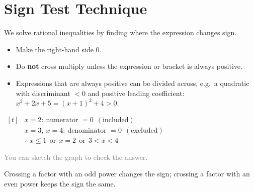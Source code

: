 \documentclass[a4paper,11pt,oneside]{book}
\providecommand{\sidenote}[1]{{\small\textcolor{gray}{#1}}}
\providecommand{\cdisp}[1]{\par\noindent$\displaystyle\begin{aligned}[t]#1\end{aligned}$\par\smallskip}
\renewcommand{\cdisp}[1]{\par\noindent\hfill$\displaystyle\begin{aligned}[t]#1\end{aligned}$\hfill\null\par\smallskip}
\begin{document}
\section{Sign Test Technique}
We solve rational inequalities by finding where the expression changes sign.\par
\begin{itemize}\setlength\itemsep{0pt}\setlength\parskip{0pt}
\item Make the right-hand side $0$.
\item Do \textbf{not} cross multiply unless the expression or bracket is always positive.
\item Expressions that are always positive can be divided across, e.g.\ a quadratic with discriminant $<0$ and positive leading coefficient: $x^{2}+2x+5=(x+1)^{2}+4>0$.
\end{itemize}
\exlab
{}
\begin{center}\end{center}
\cdisp{&x=2:\ \text{numerator }=0\ \ (\text{included})\\
&x=3,\ x=4:\ \text{denominator }=0\ \ (\text{excluded})\\
&\therefore\ x\leqslant1\ \ \text{or}\ \ x=2\ \ \text{or}\ \ 3<x<4}
\sidenote{You can sketch the graph to check the answer.}\par
\begin{info}[title=Note]
Crossing a factor with an odd power changes the sign; crossing a factor with an even power keeps the sign the same.
\end{info}
\clearpage
\end{document}

